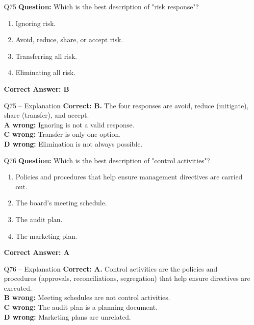 \documentclass[aspectratio=169,10pt]{beamer}
\begin{document}
	\begin{frame}[t]{Q75}
		\small
		\textbf{Question:} Which is the best description of "risk response"?
		\begin{enumerate}[label=\Alph*.,itemsep=1pt,topsep=2pt]
			\item Ignoring risk.
			\item Avoid, reduce, share, or accept risk.
			\item Transferring all risk.
			\item Eliminating all risk.
		\end{enumerate}
		\vspace{4pt}
		\textbf{Correct Answer: B}
	\end{frame}
	
	\begin{frame}[t]{Q75 -- Explanation}
		\small
		\textbf{Correct: B.} The four responses are avoid, reduce (mitigate), share (transfer), and accept. \\[4pt]
		\textbf{A wrong:} Ignoring is not a valid response. \\[2pt]
		\textbf{C wrong:} Transfer is only one option. \\[2pt]
		\textbf{D wrong:} Elimination is not always possible.
	\end{frame}
	
	\begin{frame}[t]{Q76}
		\small
		\textbf{Question:} Which is the best description of "control activities"?
		\begin{enumerate}[label=\Alph*.,itemsep=1pt,topsep=2pt]
			\item Policies and procedures that help ensure management directives are carried out.
			\item The board's meeting schedule.
			\item The audit plan.
			\item The marketing plan.
		\end{enumerate}
		\vspace{4pt}
		\textbf{Correct Answer: A}
	\end{frame}
	
	\begin{frame}[t]{Q76 -- Explanation}
		\small
		\textbf{Correct: A.} Control activities are the policies and procedures (approvals, reconciliations, segregation) that help ensure directives are executed. \\[4pt]
		\textbf{B wrong:} Meeting schedules are not control activities. \\[2pt]
		\textbf{C wrong:} The audit plan is a planning document. \\[2pt]
		\textbf{D wrong:} Marketing plans are unrelated.
	\end{frame}
	
\end{document}

